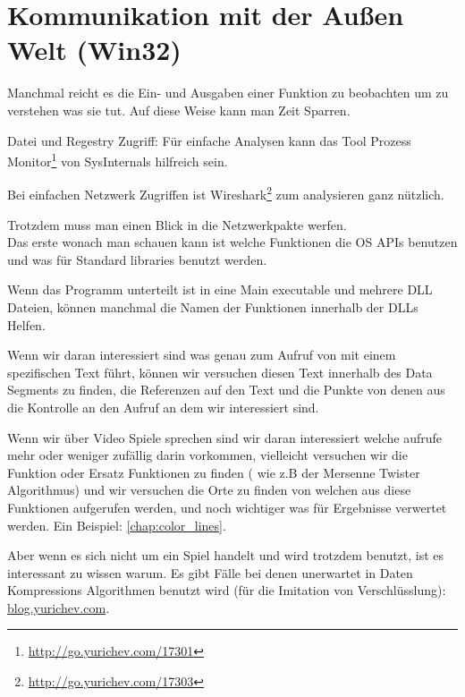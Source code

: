 \section{Kommunikation mit der Außen Welt (Win32)}

Manchmal reicht es die Ein- und Ausgaben einer Funktion zu beobachten um zu verstehen was sie tut.
Auf diese Weise kann man Zeit Sparren.

Datei und Regestry Zugriff:
F\"ur einfache Analysen kann das Tool Prozess Monitor\footnote{\url{http://go.yurichev.com/17301}}
von SysInternals hilfreich sein.

Bei einfachen Netzwerk Zugriffen ist Wireshark\footnote{\url{http://go.yurichev.com/17303}} zum analysieren ganz n\"utzlich.

Trotzdem muss man einen Blick in die Netzwerkpakte werfen.
\\
Das erste wonach man schauen kann ist welche Funktionen die \ac{OS} \ac{API}s benutzen und was f\"ur Standard libraries
benutzt werden. 

Wenn das Programm unterteilt ist in eine Main executable und mehrere DLL Dateien, k\"onnen manchmal die Namen der Funktionen innerhalb
der DLLs Helfen. 

Wenn wir daran interessiert sind was genau zum Aufruf von  mit einem spezifischen Text f\"uhrt,
k\"onnen wir versuchen diesen Text innerhalb des Data Segments zu finden, die Referenzen auf den Text und die 
Punkte von denen aus die Kontrolle an den  Aufruf an dem wir interessiert sind. %

Wenn wir \"uber Video Spiele sprechen sind wir daran interessiert welche \rand aufrufe mehr oder weniger zuf\"allig darin vorkommen,
vielleicht versuchen wir die \rand Funktion oder Ersatz Funktionen zu finden ( wie z.B der Mersenne Twister Algorithmus) 
und wir versuchen die Orte zu finden von welchen aus diese Funktionen aufgerufen werden, und noch wichtiger was f\"ur
Ergebnisse verwertet werden. 
Ein Beispiel: \ref{chap:color_lines}.

Aber wenn es sich nicht um ein Spiel handelt und \rand wird trotzdem benutzt, ist es interessant zu wissen warum.
Es gibt F\"alle bei denen unerwartet \rand in Daten Kompressions Algorithmen benutzt wird (f\"ur die Imitation von Verschl\"usslung):
\href{http://go.yurichev.com/17221}{blog.yurichev.com}.

